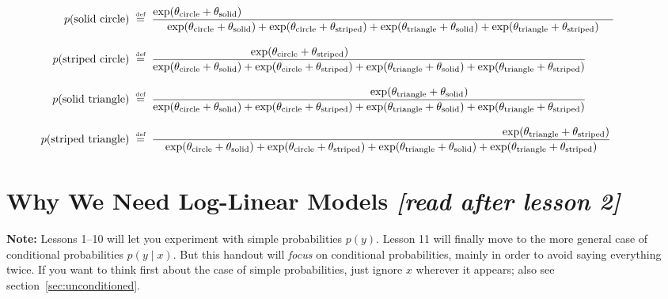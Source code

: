 \documentclass[11pt]{article}
\newcommand{\defeq}{\;\stackrel{\mbox{\tiny def}}{=}\;}
\begin{document}
\begin{align*}
\hspace{-12mm}p(\text{solid circle}) & \defeq \frac{\exp (\theta_{\textrm{circle}}+\theta_{\textrm{solid}})\hspace{118mm}}{\exp (\theta_{\textrm{circle}} + \theta_{\textrm{solid}}) + \exp (\theta_{\textrm{circle}} + \theta_{\textrm{striped}}) + \exp (\theta_{\textrm{triangle}} + \theta_{\textrm{solid}}) + \exp (\theta_{\textrm{triangle}} + \theta_{\textrm{striped}})} \\
\rule{0in}{1.5\baselineskip}
\hspace{-12mm}p(\text{striped circle}) & \defeq \frac{\exp (\theta_{\textrm{circle}}+\theta_{\textrm{striped}})\hspace{44mm}}{\exp (\theta_{\textrm{circle}} + \theta_{\textrm{solid}}) + \exp (\theta_{\textrm{circle}} + \theta_{\textrm{striped}}) + \exp (\theta_{\textrm{triangle}} + \theta_{\textrm{solid}}) + \exp (\theta_{\textrm{triangle}} + \theta_{\textrm{striped}})} \\
\rule{0in}{1.5\baselineskip}
\hspace{-12mm}p(\text{solid triangle}) & \defeq \frac{\hspace{32mm}\exp (\theta_{\textrm{triangle}}+\theta_{\textrm{solid}})}{\exp (\theta_{\textrm{circle}} + \theta_{\textrm{solid}}) + \exp (\theta_{\textrm{circle}} + \theta_{\textrm{striped}}) + \exp (\theta_{\textrm{triangle}} + \theta_{\textrm{solid}}) + \exp (\theta_{\textrm{triangle}} + \theta_{\textrm{striped}})} \\
\rule{0in}{1.5\baselineskip}
\hspace{-12mm}p(\text{striped triangle}) & \defeq \frac{\hspace{111mm}\exp (\theta_{\textrm{triangle}}+\theta_{\textrm{striped}})}{\exp (\theta_{\textrm{circle}} + \theta_{\textrm{solid}}) + \exp (\theta_{\textrm{circle}} + \theta_{\textrm{striped}}) + \exp (\theta_{\textrm{triangle}} + \theta_{\textrm{solid}}) + \exp (\theta_{\textrm{triangle}} + \theta_{\textrm{striped}})}
\end{align*}

\section{Why We Need Log-Linear Models {\em [read after lesson 2]}}

{\bf Note:} Lessons 1--10 will let you experiment with simple
probabilities $p(y)$.  Lesson 11 will finally move to the more general
case of conditional probabilities $p(y\mid x)$.  But this handout will
{\em focus} on conditional probabilities, mainly in order to avoid saying
everything twice.  If you want to think first about the case of simple
probabilities, just ignore $x$ wherever it appears; also see
section~\ref{sec:unconditioned}.
\end{document}
